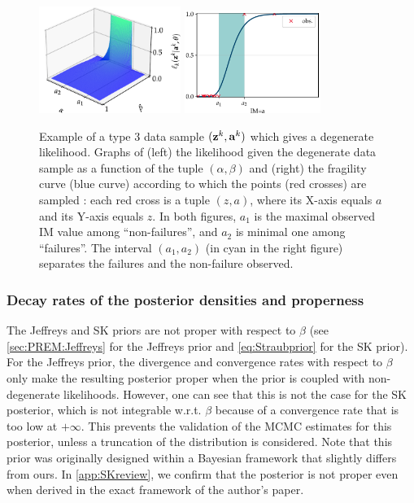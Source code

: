 \begin{figure}[h]
    \centering
    \includegraphics[width=4.6cm]{figures/PREM/likelihood_degen.pdf}\qquad
    \includegraphics[width=4.44cm]{figures/PREM/degeneracy.pdf}
    \caption{{Example of a type 3 data sample $(\mathbf{z}^k,\mathbf{a}^k)$ which gives a degenerate likelihood. Graphs of (left) the likelihood given the degenerate data sample as a function of the tuple $(\alpha,\beta)$ and (right) the fragility curve (blue curve) according to which the points (red crosses) are sampled : each red cross is a tuple $(z,a)$, where its X-axis equals $a$ and its Y-axis equals $z$.}
    In both figures, $a_1$ is the maximal observed IM value among ``non-failures'', and $a_2$ is minimal one among ``failures''.
    The interval $(a_1,a_2)$ (in cyan in the right figure) separates the failures and the non-failure observed.
    }
    \label{fig:degenerate-frag}
\end{figure}




\subsubsection{Decay rates of the posterior densities and properness}


The Jeffreys and SK priors are not proper with respect to $\beta$ (see \cref{sec:PREM:Jeffreys} for the Jeffreys prior and \cref{eq:Straubprior} for the SK prior). For the Jeffreys prior, the divergence and convergence rates with respect to $\beta$ only make the resulting posterior proper when the prior is coupled with non-degenerate likelihoods. 
 However, one can see that this is not the case for the SK posterior, which is not integrable w.r.t. $\beta$ because of a convergence rate that is too low at $+\infty$. This prevents the validation of the MCMC estimates for this posterior, unless a truncation of the distribution is considered. %
 Note that this prior was originally designed within
a Bayesian framework that slightly differs from ours. In \cref{app:SKreview}, we confirm that the posterior is not proper even when derived in the exact framework of the author's paper. %



